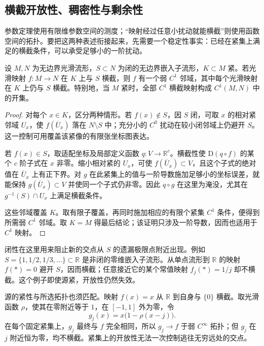 \subsection{横截开放性、稠密性与剩余性}
\label{g2:subsec:1403:04}

参数定理使用有限维参数空间的测度；“映射经过任意小扰动就能横截”则使用函数空间的拓扑。要把这两种表述衔接起来，先需要一个稳定性事实：已经在紧集上满足的横截条件，可以承受足够小的一阶扰动。

\begin{proposition}\label{g2:prop:transversality-open-on-compact}
	设 \(M,N\) 为无边界光滑流形，\(S\subset N\) 为闭的无边界嵌入子流形，\(K\subset M\) 紧。若光滑映射 \(f:M\to N\) 在 \(K\) 上与 \(S\) 横截，则 \(f\) 有一个弱 \(C^1\) 邻域，其中每个光滑映射在 \(K\) 上仍与 \(S\) 横截。特别地，当 \(M\) 紧时，全部 \(C^1\) 横截映射构成 \(C^1(M,N)\) 中的开集。
\end{proposition}
\begin{proof}
	对每个 \(x\in K\)，区分两种情形。若 \(f(x)\notin S\)，因 \(S\) 闭，可取 \(x\) 的相对紧邻域 \(U_x\)，使 \(f(\overline U_x)\) 落在 \(N\setminus S\) 中；充分小的 \(C^0\) 扰动在较小闭邻域上仍避开 \(S\)。这一控制可用覆盖该紧像的有限张坐标图表达。

	若 \(f(x)\in S\)，取适配坐标及局部定义函数 \(q:V\to\mathbb R^c\)。横截性使 \(\mathrm{D}(q\circ f)\) 的某个 \(c\) 阶子式在 \(x\) 非零。缩小相对紧的 \(U_x\)，可使 \(f(\overline U_x)\subset V\)，且这个子式的绝对值在 \(\overline U_x\) 上有正下界。对 \(g\) 在此紧集上的值与一阶导数施加足够小的坐标误差，就能保持 \(g(\overline U_x)\subset V\) 并使同一个子式仍非零。因此 \(q\circ g\) 在这里为淹没，尤其在 \(g^{-1}(S)\cap U_x\) 上满足横截条件。

	这些邻域覆盖 \(K\)。取有限子覆盖，再同时施加相应的有限个紧集 \(C^1\) 条件，便得到所需弱 \(C^1\) 邻域。取 \(K=M\) 得最后结论；该证明只涉及一阶导数，因而也适用于 \(C^1\) 映射。
\end{proof}

闭性在这里用来阻止新的交点从 \(S\) 的遗漏极限点附近出现。例如 \(S=\{1,1/2,1/3,\ldots\}\subset\mathbb R\) 是非闭的零维嵌入子流形。从单点流形到 \(\mathbb R\) 的映射 \(f(*)=0\) 避开 \(S\)，因而横截；任意接近它的某个常值映射 \(f_j(*)=1/j\) 却不横截。这个例子即使源紧，开放性仍然失效。

\ProseParagraphBreak

源的紧性与所选拓扑也须匹配。映射 \(f(x)=x\) 从 \(\mathbb R\) 到自身与 \(\{0\}\) 横截。取光滑函数 \(\rho\)，使其在零附近等于 \(1\)，在 \([-1,1]\) 外为零，令
\[
	g_j(x)=x\bigl(1-\rho(x-j)\bigr).
\]
在每个固定紧集上，\(g_j\) 最终与 \(f\) 完全相同，所以 \(g_j\to f\) 于弱 \(C^\infty\) 拓扑；但 \(g_j\) 在 \(j\) 附近恒为零，均不横截。紧集上的开放性无法一次控制逃往无穷远处的交点。

